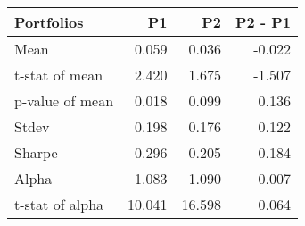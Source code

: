 \begin{tabular}{lrrr}
\toprule
Portfolios & P1 & P2 & P2 - P1 \\
\midrule
Mean & 0.059 & 0.036 & -0.022 \\
t-stat of mean & 2.420 & 1.675 & -1.507 \\
p-value of mean & 0.018 & 0.099 & 0.136 \\
Stdev & 0.198 & 0.176 & 0.122 \\
Sharpe & 0.296 & 0.205 & -0.184 \\
Alpha & 1.083 & 1.090 & 0.007 \\
t-stat of alpha & 10.041 & 16.598 & 0.064 \\
\bottomrule
\end{tabular}
